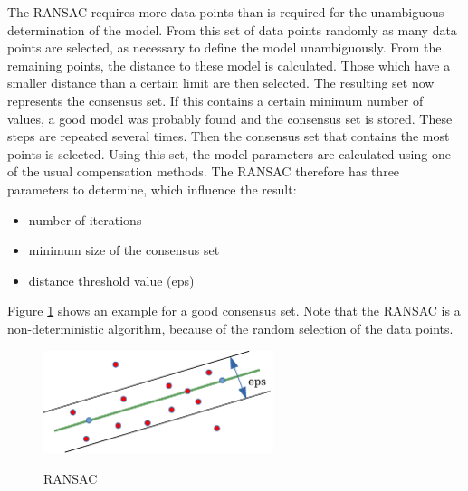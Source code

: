 
The \ac{RANSAC} requires more data points than is required for the unambiguous determination of the model. 
From this set of data points randomly as many data points are selected, as necessary to define the model unambiguously. 
From the remaining points, the distance to these model is calculated.
Those which have a smaller distance than a certain limit are then selected.
The resulting set now represents the consensus set. If this contains a certain minimum number of values, a good model was probably found and the consensus set is stored.
These steps are repeated several times. Then the consensus set that contains the most points is selected. Using this set, 
the model parameters are calculated using one of the usual compensation methods. The \ac{RANSAC} therefore has three parameters to determine, which influence the result:

\begin{itemize}
 \item number of iterations
 \item minimum size of the consensus set
 \item distance threshold value (eps)
\end{itemize}
Figure \ref{ransac} shows an example for a good consensus set. Note that the \ac{RANSAC} is a non-deterministic algorithm, because of the random selection of the data points.

\begin{figure}[!ht]
\begin{center}
\caption{\acs{RANSAC}}
\includegraphics[width=0.6\textwidth]{bilder/ransac.pdf}
\label{ransac}
\end{center}
\end{figure}

